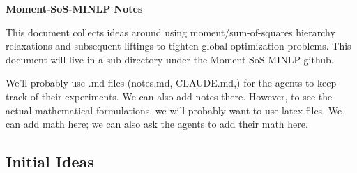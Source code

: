 \documentclass[12pt]{article}
\begin{document}
\pagestyle{plain}

\begin{center}
\large{\bf Moment-SoS-MINLP Notes}
\end{center}

This document collects ideas around using moment/sum-of-squares hierarchy relaxations and subsequent liftings to tighten global optimization problems. This document will live in a sub directory under the Moment-SoS-MINLP github. 

\vspace{8pt}

We'll probably use .md files (notes.md, CLAUDE.md,) for the agents to keep track of their experiments. We can also add notes there. However, to see the actual mathematical formulations, we will probably want to use latex files. We can add math here; we can also ask the agents to add their math here.

\subsection*{Initial Ideas}
\end{document}
